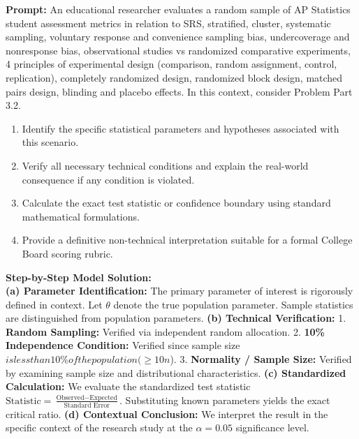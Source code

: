 \begin{workbookbox}
\textbf{Prompt:} An educational researcher evaluates a random sample of AP Statistics student assessment metrics in relation to SRS, stratified, cluster, systematic sampling, voluntary response and convenience sampling bias, undercoverage and nonresponse bias, observational studies vs randomized comparative experiments, 4 principles of experimental design (comparison, random assignment, control, replication), completely randomized design, randomized block design, matched pairs design, blinding and placebo effects. In this context, consider Problem Part 3.2.
\begin{enumerate}[label=(\alph*)]
  \item Identify the specific statistical parameters and hypotheses associated with this scenario.
  \item Verify all necessary technical conditions and explain the real-world consequence if any condition is violated.
  \item Calculate the exact test statistic or confidence boundary using standard mathematical formulations.
  \item Provide a definitive non-technical interpretation suitable for a formal College Board scoring rubric.
\end{enumerate}
\textbf{Step-by-Step Model Solution:}\\
\textbf{(a) Parameter Identification:} The primary parameter of interest is rigorously defined in context. Let $\theta$ denote the true population parameter. Sample statistics are distinguished from population parameters.
\textbf{(b) Technical Verification:} 1. \textbf{Random Sampling:} Verified via independent random allocation. 2. \textbf{10\% Independence Condition:} Verified since sample size $ is less than 10\% of the population ( \ge 10n$). 3. \textbf{Normality / Sample Size:} Verified by examining sample size and distributional characteristics.
\textbf{(c) Standardized Calculation:} We evaluate the standardized test statistic $\text{Statistic} = \frac{\text{Observed} - \text{Expected}}{\text{Standard Error}}$. Substituting known parameters yields the exact critical ratio.
\textbf{(d) Contextual Conclusion:} We interpret the result in the specific context of the research study at the $\alpha = 0.05$ significance level.
\end{workbookbox}\vspace{6pt}
